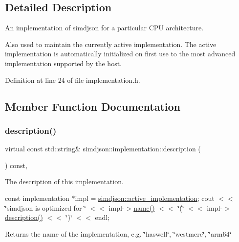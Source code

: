 \subsection{Detailed Description}
An implementation of simdjson for a particular C\+PU architecture. 

Also used to maintain the currently active implementation. The active implementation is automatically initialized on first use to the most advanced implementation supported by the host. 

Definition at line 24 of file implementation.\+h.



\subsection{Member Function Documentation}
\mbox{\label{classsimdjson_1_1implementation_a4f41daefefc573e20fccd591b158e063}} 
\subsubsection{\texorpdfstring{description()}{description()}}
{\footnotesize\ttfamily virtual const std\+::string\& simdjson\+::implementation\+::description (\begin{DoxyParamCaption}{ }\end{DoxyParamCaption}) const\hspace{0.3cm}{\ttfamily [inline]}, {\ttfamily [virtual]}}



The description of this implementation. 

const implementation $\ast$impl = \hyperlink{namespacesimdjson_a9ed6efb6da2dda95f75256aaf1d0b9b4}{simdjson\+::active\+\_\+implementation}; cout $<$$<$ \char`\"{}simdjson is optimized for \char`\"{} $<$$<$ impl-\/$>$\hyperlink{classsimdjson_1_1implementation_a404c32ec6187ac0fb5b2ec6b5aea4abd}{name()} $<$$<$ \char`\"{}(\char`\"{} $<$$<$ impl-\/$>$\hyperlink{classsimdjson_1_1implementation_a4f41daefefc573e20fccd591b158e063}{description()} $<$$<$ \char`\"{})\char`\"{} $<$$<$ endl;

\begin{DoxyReturn}{Returns}
the name of the implementation, e.\+g. \char`\"{}haswell\char`\"{}, \char`\"{}westmere\char`\"{}, \char`\"{}arm64\char`\"{} 
\end{DoxyReturn}


